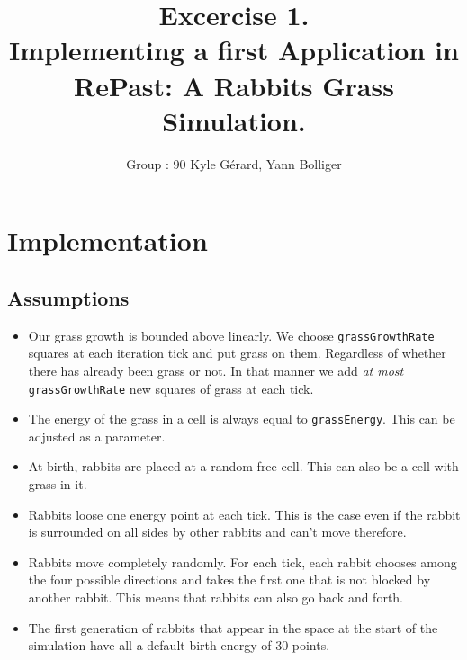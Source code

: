 \documentclass[11pt]{article}
\title{\bf Excercise 1.\\ Implementing a first Application in RePast: A Rabbits Grass Simulation.}
\author{Group \textnumero: 90  Kyle Gérard, Yann Bolliger}
\begin{document}
 \maketitle

 \section{Implementation}

\subsection{Assumptions}
\begin{itemize}

\item 
Our grass growth is bounded above linearly. We choose \texttt{grassGrowthRate} 
squares at each iteration tick and put grass on them. Regardless of whether 
there has already been grass or not. In that manner we add \textit{at most} \texttt{grassGrowthRate} 
new squares of grass at each tick.

\item 
The energy of the grass in a cell is always equal to \texttt{grassEnergy}.
This can be adjusted as a parameter.

 \item
 At birth, rabbits are placed at a random free cell. This can also be a cell 
 with grass in it.
 
 \item
  Rabbits loose one energy point at each tick. This is the case even if the rabbit is
  surrounded on all sides by other rabbits and can't move therefore.
  
  \item
   Rabbits move completely randomly. For each tick, each rabbit chooses among 
   the four possible directions and takes the first one that is not blocked by 
   another rabbit. This means that rabbits can also go back and forth.
   
   \item
   The first generation of rabbits that appear in the space at the start of the simulation
   have all a default birth energy of 30 points. 
\end{itemize}
\end{document}
